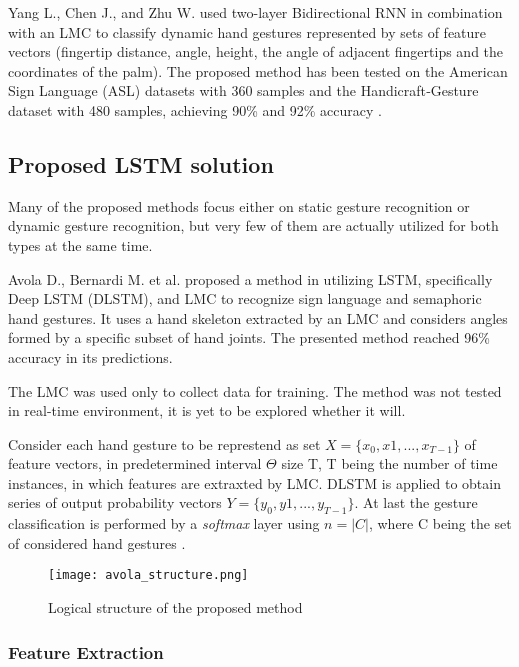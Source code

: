 Yang L., Chen J., and Zhu W. \cite{bidirect_dynam} used two-layer Bidirectional RNN in combination with an LMC to classify dynamic hand gestures represented by sets of feature vectors (fingertip distance, angle, height, the angle of adjacent fingertips and the coordinates of the palm). The proposed method has been tested on the American Sign Language (ASL) datasets with 360 samples and the Handicraft‐Gesture dataset with 480 samples, achieving 90\% and 92\% accuracy \cite{bidirect_dynam}.

\subsection{Proposed LSTM solution}

Many of the proposed methods focus either on static gesture recognition or dynamic gesture recognition, but very few of them are actually utilized for both types at the same time. 

Avola D., Bernardi M. et al. proposed a method in \cite{avola} utilizing LSTM, specifically Deep LSTM (DLSTM), and LMC to recognize sign language and semaphoric hand gestures. It uses a hand skeleton extracted by an LMC and considers angles formed by a specific subset of hand joints. The presented method reached 96\% accuracy in its predictions.

The LMC was used only to collect data for training. The method was not tested in real-time environment, it is yet to be explored whether it will.

Consider each hand gesture to be represtend as set $X = \{x_0, x1, ..., x_{T-1}\}$ of feature vectors, in predetermined interval $\Theta$ size T, T being the number of time instances, in which features are extraxted by LMC. DLSTM is applied to obtain series of output probability vectors $Y = \{y_0, y1, ..., y_{T-1}\}$. At last the gesture classification is performed by a \textit{softmax} layer using $n = |C|$, where C being the set of considered hand gestures \cite{avola}.

\begin{figure}[ht]
	\centering
    \texttt{[image: avola\_structure.png]}
	\caption{Logical structure of the proposed method \cite{avola}}
	\label{fig:lstm_gesture_structure}
\end{figure}

\subsubsection{Feature Extraction}

